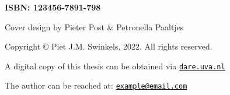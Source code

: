 
\vspace*{\fill}

\textbf{ISBN: 123456-7891-798}

\vspace*{0.3cm}

Cover design by Pieter Post \& Petronella Paaltjes

\vspace*{0.3cm}

Copyright © Piet J.M. Swinkels, 2022. All rights reserved.

\vspace*{1.2cm}

A digital copy of this thesis can be obtained via \texttt{\href{https://www.dare.uva.nl/}{dare.uva.nl}}

\vspace*{0.3cm}

The author can be reached at: \texttt{\href{mailto:example@email.com}{example@email.com}}

\vspace*{1.2cm}